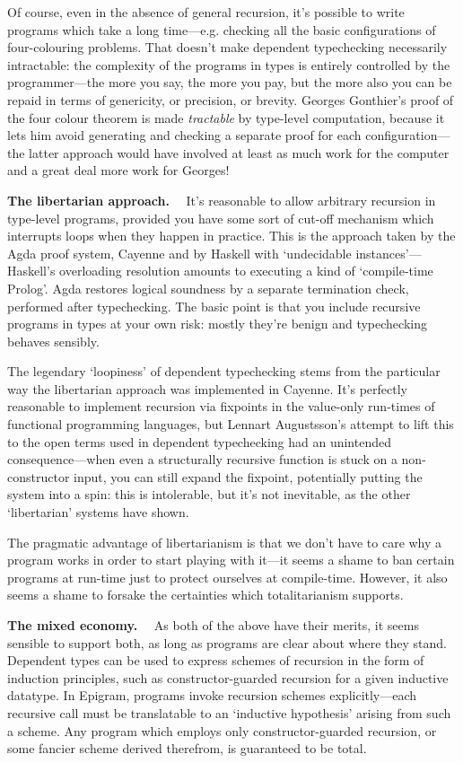 \documentclass{fundam}
\begin{document}
Of course, even in the absence of general recursion, it's possible to
write programs which take a long time---e.g. checking all the basic
configurations of four-colouring problems. That doesn't make dependent
typechecking necessarily intractable: the complexity of the programs
in types is entirely controlled by the programmer---the more you say,
the more you pay, but the more also you can be repaid in terms of
genericity, or precision, or brevity. Georges Gonthier's proof of the
four colour theorem \cite{gonthier:four} is made \emph{tractable} by
type-level computation, because it lets him avoid generating and
checking a separate proof for each configuration---the latter approach
would have involved at least as much work for the computer and a great
deal more work for Georges!


\textbf{The libertarian approach.}$\quad$
%
It's reasonable to allow arbitrary recursion in type-level programs,
provided you have some sort of cut-off mechanism which interrupts
loops when they happen in practice. This is the approach taken by the
Agda proof system, Cayenne and by Haskell with
`undecidable instances'---Haskell's overloading resolution amounts
to executing a kind of `compile-time Prolog'. Agda restores logical
soundness by a separate termination check, performed after typechecking.
The basic point is that you include recursive programs in types at your
own risk: mostly they're benign and typechecking behaves sensibly.

The legendary `loopiness' of dependent typechecking stems from the
particular way the libertarian approach was implemented in Cayenne. It's
perfectly reasonable to implement recursion via fixpoints in the
value-only run-times of functional programming languages, but Lennart
Augustsson's attempt to lift this to the open terms used in dependent
typechecking had an unintended consequence---when even a structurally
recursive function is stuck on a non-constructor input, you can still
expand the fixpoint, potentially putting the system into a
spin: this is intolerable, but it's not inevitable, as the other
`libertarian' systems have shown.

The pragmatic advantage of libertarianism is that we don't have to
care why a program works in order to start playing with it---it
seems a shame to ban certain programs at run-time just to protect
ourselves at compile-time. However, it also seems a shame to forsake
the certainties which totalitarianism supports.

\textbf{The mixed economy.}$\quad$
%
As both of the above have their merits, it seems
sensible to support both, as long as programs are clear about where
they stand.  Dependent types can be used to express schemes of
recursion in the form of induction principles, such as
constructor-guarded recursion for a given inductive datatype. In
Epigram, programs invoke recursion schemes explicitly---each recursive
call must be translatable to an `inductive hypothesis' arising from
such a scheme. Any program which employs only constructor-guarded
recursion, or some fancier scheme derived therefrom, is guaranteed
to be total.
\end{document}
